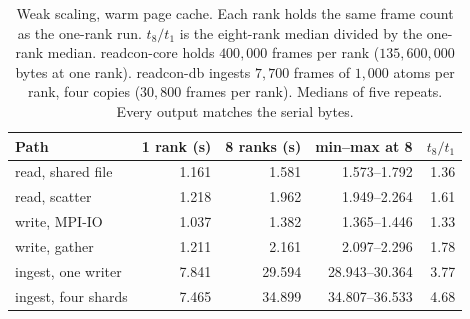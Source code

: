 \begin{table}[ht]
\centering
\small
\caption{Weak scaling, warm page cache. Each rank holds the same frame count as the one-rank run. $t_8/t_1$ is the eight-rank median divided by the one-rank median. readcon-core holds $400{,}000$ frames per rank ($135{,}600{,}000$ bytes at one rank). readcon-db ingests $7{,}700$ frames of $1{,}000$ atoms per rank, four copies ($30{,}800$ frames per rank). Medians of five repeats. Every output matches the serial bytes.}
\label{tab:mpi-weak}
\begin{tabular}{lrrrr}
\toprule
Path & 1 rank (s) & 8 ranks (s) & min--max at 8 & $t_8/t_1$ \\
\midrule
read, shared file & 1.161 & 1.581 & 1.573--1.792 & 1.36 \\
read, scatter & 1.218 & 1.962 & 1.949--2.264 & 1.61 \\
write, MPI-IO & 1.037 & 1.382 & 1.365--1.446 & 1.33 \\
write, gather & 1.211 & 2.161 & 2.097--2.296 & 1.78 \\
ingest, one writer & 7.841 & 29.594 & 28.943--30.364 & 3.77 \\
ingest, four shards & 7.465 & 34.899 & 34.807--36.533 & 4.68 \\
\bottomrule
\end{tabular}
\end{table}
